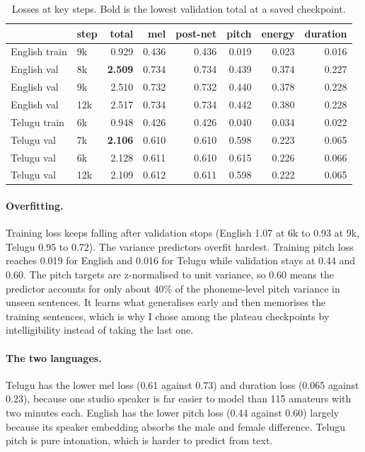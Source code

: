 \documentclass[11pt,a4paper]{article}
\begin{document}
\begin{table}[!htbp]
\centering\small
\begin{tabular}{llrrrrrr}
\toprule
& step & total & mel & post-net & pitch & energy & duration \\
\midrule
English train & 9k & 0.929 & 0.436 & 0.436 & 0.019 & 0.023 & 0.016 \\
English val   & 8k & \textbf{2.509} & 0.734 & 0.734 & 0.439 & 0.374 & 0.227 \\
English val   & 9k & 2.510 & 0.732 & 0.732 & 0.440 & 0.378 & 0.228 \\
English val   & 12k & 2.517 & 0.734 & 0.734 & 0.442 & 0.380 & 0.228 \\
\midrule
Telugu train  & 6k & 0.948 & 0.426 & 0.426 & 0.040 & 0.034 & 0.022 \\
Telugu val    & 7k & \textbf{2.106} & 0.610 & 0.610 & 0.598 & 0.223 & 0.065 \\
Telugu val    & 6k & 2.128 & 0.611 & 0.610 & 0.615 & 0.226 & 0.066 \\
Telugu val    & 12k & 2.109 & 0.612 & 0.611 & 0.598 & 0.222 & 0.065 \\
\bottomrule
\end{tabular}
\caption{Losses at key steps. Bold is the lowest validation total at a saved checkpoint.}
\label{tab:loss}
\end{table}

\paragraph{Overfitting.} Training loss keeps falling after validation stops (English 1.07 at 6k to 0.93 at 9k,
Telugu 0.95 to 0.72). The variance predictors overfit hardest. Training pitch loss reaches 0.019 for English and
0.016 for Telugu while validation stays at 0.44 and 0.60. The pitch targets are z-normalised to unit variance, so 0.60
means the predictor accounts for only about 40\% of the phoneme-level pitch variance in unseen sentences. It learns
what generalises early and then memorises the training sentences, which is why I chose among the plateau
checkpoints by intelligibility instead of taking the last one.

\paragraph{The two languages.} Telugu has the lower mel loss (0.61 against 0.73) and duration loss (0.065 against
0.23), because one studio speaker is far easier to model than 115 amateurs with two minutes each. English has the
lower pitch loss (0.44 against 0.60) largely because its speaker embedding absorbs the male and female difference.
Telugu pitch is pure intonation, which is harder to predict from text.
\end{document}
